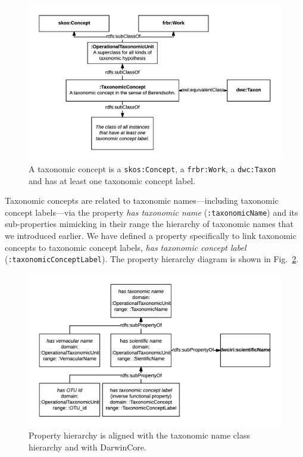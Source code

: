 \begin{figure}[h!]
\centering
  \includegraphics[width=\textwidth]{Figures/taxonomic-concept-diagram}
  \decoRule
  \caption[Taxonomic concept diagram.]{
  A taxonomic concept is a {\tt skos:Concept}, a {\tt frbr:Work}, a {\tt dwc:Taxon} and has at least one taxonomic concept label.}
  \label{taxonomic-concept-diagram}
\end{figure}

Taxonomic concepts are related to taxonomic names---including taxonomic concept labels---via the property \emph{has taxonomic name} ({\tt :taxonomicName}) and its sub-properties mimicking in their range the hierarchy of taxonomic names that we introduced earlier. We have defined a property specifically to link taxonomic concepts to taxonomic concept labels, \emph{has taxonomic concept label} ({\tt :taxonomicConceptLabel}). The property hierarchy diagram is shown in Fig.~\ref{name-property-hierarchy}.

\begin{figure}[h!]
\centering
  \includegraphics[width=\textwidth]{Figures/name-property-hierarchy}
  \decoRule
  \caption[axonomic name property hierarchy diagram.]
  {Property hierarchy is aligned with the taxonomic name class hierarchy and with DarwinCore.}
  \label{name-property-hierarchy}
\end{figure}

